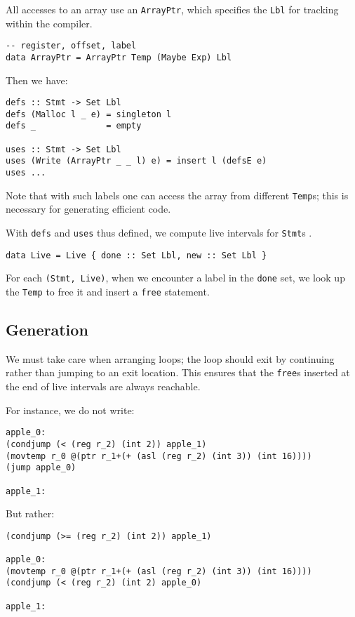 \documentclass[acmsmall,screen,anonymous,nonacm]{acmart}
\begin{document}
All accesses to an array use an {\tt ArrayPtr}, which specifies the {\tt Lbl} for tracking within the compiler.

\begin{verbatim}
-- register, offset, label
data ArrayPtr = ArrayPtr Temp (Maybe Exp) Lbl
\end{verbatim}

Then we have:

\begin{verbatim}
defs :: Stmt -> Set Lbl
defs (Malloc l _ e) = singleton l
defs _              = empty

uses :: Stmt -> Set Lbl
uses (Write (ArrayPtr _ _ l) e) = insert l (defsE e)
uses ...
\end{verbatim}


Note that with such labels one can access the array from different {\tt Temp}s; this is necessary for generating efficient code.

With {\tt defs} and {\tt uses} thus defined, we compute live intervals for {\tt Stmt}s \cite{poletto1999}.

\begin{verbatim}
data Live = Live { done :: Set Lbl, new :: Set Lbl }
\end{verbatim}

For each {\tt (Stmt, Live)}, when we encounter a label in the {\tt done} set, we look up the {\tt Temp} to free it and insert a {\tt free} statement.

\subsection{Generation}

We must take care when arranging loops; the loop should exit by continuing rather than jumping to an exit location. This ensures that the {\tt free}s inserted at the end of live intervals are always reachable.

For instance, we do not write:

\begin{verbatim}
apple_0:
(condjump (< (reg r_2) (int 2)) apple_1)
(movtemp r_0 @(ptr r_1+(+ (asl (reg r_2) (int 3)) (int 16))))
(jump apple_0)

apple_1:
\end{verbatim}

But rather:

\begin{verbatim}
(condjump (>= (reg r_2) (int 2)) apple_1)

apple_0:
(movtemp r_0 @(ptr r_1+(+ (asl (reg r_2) (int 3)) (int 16))))
(condjump (< (reg r_2) (int 2) apple_0)

apple_1:
\end{verbatim}
\end{document}
